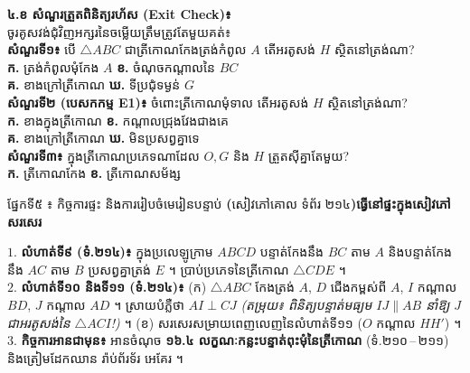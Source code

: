 \documentclass[a4paper,10pt]{article}
\newcommand{\en}[1]{{\TimesEn #1}}
\newcommand{\enbf}[1]{{\TimesEn\textbf{#1}}}
\newcommand{\tri}[1]{\ensuremath{\triangle #1}}
\newcommand{\secbar}[2]{%
  \vspace{3pt}%
  \begin{tcolorbox}[
    enhanced, sharp corners, colback=headgray, colframe=black,
    boxrule=0.9pt, boxsep=1pt, top=2.5pt, bottom=2.5pt, left=6pt, right=6pt,
    after skip=3pt
  ]
    {\muol\fontsize{9.2pt}{13.5pt}\selectfont #1}\hfill{\fontsize{8.3pt}{11.5pt}\selectfont\textbf{#2}}
  \end{tcolorbox}%
}
\begin{document}
\begin{minipage}[t]{8.6cm}\vspace{0pt}
  \begin{tcolorbox}[
    enhanced, sharp corners, colback=white, colframe=black, equal height group=rowE5,
    boxrule=0.85pt, boxsep=2.2pt, top=3.5pt, bottom=3.5pt, left=5pt, right=5pt
  ]
    \textbf{៤.ខ សំណួរត្រួតពិនិត្យរហ័ស (\en{Exit Check})៖}\\
    ចូរគូសវង់ជុំវិញអក្សរនៃចម្លើយត្រឹមត្រូវតែមួយគត់៖\\[3.5pt]
    \textbf{សំណួរទី១៖} បើ $\tri{ABC}$ ជាត្រីកោណកែងត្រង់កំពូល $A$ តើអរតូសង់ $H$ ស្ថិតនៅត្រង់ណា?\\
    \hspace*{0.15cm}\textbf{ក.} ត្រង់កំពូលមុំកែង $A$ \hspace{0.45cm}
    \textbf{ខ.} ចំណុចកណ្ដាលនៃ $BC$\\
    \hspace*{0.15cm}\textbf{គ.} ខាងក្រៅត្រីកោណ \hspace{0.55cm}
    \textbf{ឃ.} ទីប្រជុំទម្ងន់ $G$\\[4.5pt]
    \textbf{សំណួរទី២ (បេសកកម្ម E1)៖} ចំពោះត្រីកោណមុំទាល តើអរតូសង់ $H$ ស្ថិតនៅត្រង់ណា?\\
    \hspace*{0.15cm}\textbf{ក.} ខាងក្នុងត្រីកោណ \hspace{0.62cm}
    \textbf{ខ.} កណ្ដាលជ្រុងវែងជាងគេ\\
    \hspace*{0.15cm}\textbf{គ.} ខាងក្រៅត្រីកោណ \hspace{0.55cm}
    \textbf{ឃ.} មិនប្រសព្វគ្នាទេ\\[4.5pt]
    \textbf{សំណួរទី៣៖} ក្នុងត្រីកោណប្រភេទណាដែល $O, G$ និង $H$ ត្រួតស៊ីគ្នាតែមួយ?\\
    \hspace*{0.15cm}\textbf{ក.} ត្រីកោណកែង \hspace{0.6cm} \textbf{ខ.} ត្រីកោណសម័ង្ស
  \end{tcolorbox}
\end{minipage}

\vspace{2pt}
\secbar{ផ្នែកទី៥ ៖ កិច្ចការផ្ទះ និងការរៀបចំមេរៀនបន្ទាប់ \enbf{(}សៀវភៅគោល ទំព័រ ២១៤\enbf{)}}{ធ្វើនៅផ្ទះក្នុងសៀវភៅសរសេរ}

\begin{tcolorbox}[
  enhanced, sharp corners, colback=panelgray, colframe=black,
  boxrule=0.85pt, boxsep=2.5pt, top=3.5pt, bottom=3.5pt, left=6pt, right=6pt
]
  $1.$ \textbf{លំហាត់ទី៩ (ទំ.២១៤)៖} ក្នុងប្រលេឡូក្រាម $ABCD$ បន្ទាត់កែងនឹង $BC$ តាម $A$ និងបន្ទាត់កែងនឹង $AC$ តាម $B$ ប្រសព្វគ្នាត្រង់ $E$ ។ ប្រាប់ប្រភេទនៃត្រីកោណ $\tri{CDE}$ ។\\[2.5pt]
  $2.$ \textbf{លំហាត់ទី១០ និងទី១១ (ទំ.២១៤)៖} (ក) $\tri{ABC}$ កែងត្រង់ $A$, $D$ ជើងកម្ពស់ពី $A$, $I$ កណ្ដាល $BD$, $J$ កណ្ដាល $AD$ ។ ស្រាយបំភ្លឺថា $AI \perp CJ$ \textit{(តម្រុយ៖ ពិនិត្យបន្ទាត់មធ្យម $IJ\parallel AB$ នាំឱ្យ $J$ ជាអរតូសង់នៃ $\tri{ACI}$!)} ។ (ខ) សរសេរសម្រាយពេញលេញនៃលំហាត់ទី១១ ($O$ កណ្ដាល $HH'$) ។\\[2.5pt]
  $3.$ \textbf{កិច្ចការអានជាមុន៖} អានចំណុច \textbf{១៦.៤ លក្ខណៈកន្លះបន្ទាត់ពុះមុំនៃត្រីកោណ} (ទំ.២១០\,\en{--}\,២១១) និងត្រៀមដែកឈាន រ៉ាប់ព័រទ័រ អេគែរ ។
\end{tcolorbox}
\end{document}
